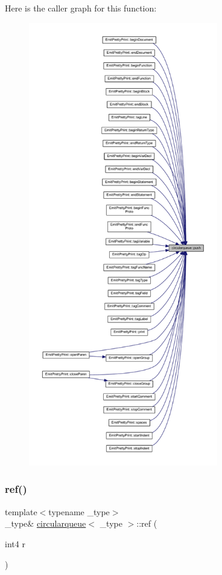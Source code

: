 Here is the caller graph for this function\+:
\nopagebreak
\begin{figure}[H]
\begin{center}
\leavevmode
\includegraphics[height=550pt]{classcircularqueue_a06f099e37388f3eccd8962f4d7199e17_icgraph}
\end{center}
\end{figure}
\mbox{\label{classcircularqueue_ab48a0be1435caaf85a8aa96fa7fe5a9c}} 
\subsubsection{\texorpdfstring{ref()}{ref()}}
{\footnotesize\ttfamily template$<$typename \+\_\+type$>$ \\
\+\_\+type\& \mbox{\hyperlink{classcircularqueue}{circularqueue}}$<$ \+\_\+type $>$\+::ref (\begin{DoxyParamCaption}\item[{int4}]{r }\end{DoxyParamCaption})\hspace{0.3cm}{\ttfamily [inline]}}



